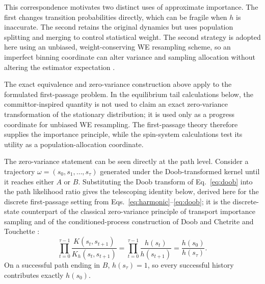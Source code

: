 \documentclass[a4paper,fleqn]{cas-sc}
\begin{document}
This correspondence motivates two distinct uses of approximate importance. The first changes
transition probabilities directly, which can be fragile when $h$ is inaccurate. The second
retains the original dynamics but uses population splitting and merging to control statistical
weight. The second strategy is adopted here using an unbiased, weight-conserving WE resampling
scheme, so an imperfect binning coordinate can alter variance and sampling allocation without
altering the estimator expectation \citep{zhang2010}.

The exact equivalence and zero-variance construction above apply to the formulated first-passage
problem. In the equilibrium tail calculations below, the committor-inspired quantity is not
used to claim an exact zero-variance transformation of the stationary distribution; it is used
only as a progress coordinate for unbiased WE resampling. The first-passage theory therefore
supplies the importance principle, while the spin-system calculations test its utility as a
population-allocation coordinate.

\label{sec:zerovar}
The zero-variance statement can be seen directly at the path level. Consider a trajectory
$\omega=(s_0,s_1,\dots,s_\tau)$ generated under the Doob-transformed kernel until it reaches
either $A$ or $B$. Substituting the Doob transform of Eq.~\eqref{eq:doob} into the path
likelihood ratio gives the telescoping identity below, derived here for the discrete
first-passage setting from Eqs.~\eqref{eq:harmonic}--\eqref{eq:doob}; it is the discrete-state
counterpart of the classical zero-variance principle of transport importance sampling
\citep{lewins1965,spanier1969,haghighat2003} and of the conditioned-process construction of
Doob \citep{doob1984} and Chetrite and Touchette \citep{chetrite2015}:
\begin{equation}
\prod_{t=0}^{\tau-1}\frac{K(s_t,s_{t+1})}{K_h(s_t,s_{t+1})}
=\prod_{t=0}^{\tau-1}\frac{h(s_t)}{h(s_{t+1})}
=\frac{h(s_0)}{h(s_\tau)} .
\label{eq:telescope}
\end{equation}
On a successful path ending in $B$, $h(s_\tau)=1$, so every successful history contributes
exactly $h(s_0)$.
\end{document}
